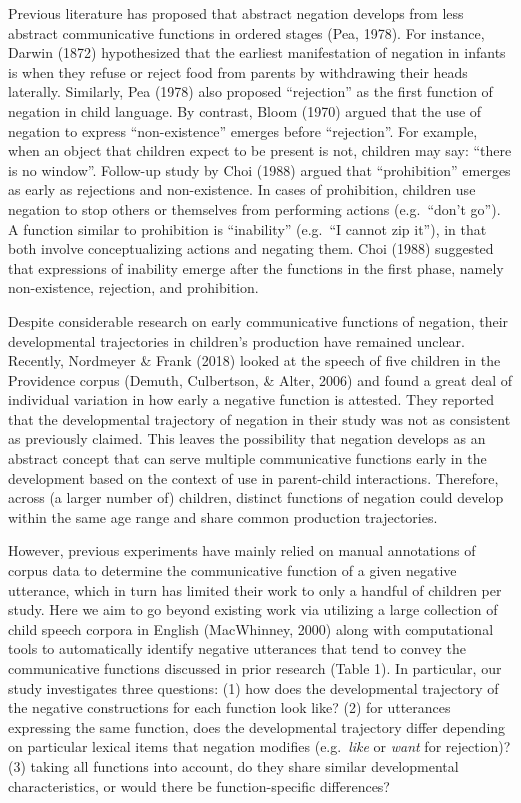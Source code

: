 \documentclass[10pt, letterpaper]{article}
\begin{document}
Previous literature has proposed that abstract negation develops from
less abstract communicative functions in ordered stages (Pea, 1978). For
instance, Darwin (1872) hypothesized that the earliest manifestation of
negation in infants is when they refuse or reject food from parents by
withdrawing their heads laterally. Similarly, Pea (1978) also proposed
``rejection'' as the first function of negation in child language. By
contrast, Bloom (1970) argued that the use of negation to express
``non-existence'' emerges before ``rejection''. For example, when an
object that children expect to be present is not, children may say:
``there is no window''. Follow-up study by Choi (1988) argued that
``prohibition'' emerges as early as rejections and non-existence. In
cases of prohibition, children use negation to stop others or themselves
from performing actions (e.g.~``don't go''). A function similar to
prohibition is ``inability'' (e.g.~``I cannot zip it''), in that both
involve conceptualizing actions and negating them. Choi (1988) suggested
that expressions of inability emerge after the functions in the first
phase, namely non-existence, rejection, and prohibition.

Despite considerable research on early communicative functions of
negation, their developmental trajectories in children's production have
remained unclear. Recently, Nordmeyer \& Frank (2018) looked at the
speech of five children in the Providence corpus (Demuth, Culbertson, \&
Alter, 2006) and found a great deal of individual variation in how early
a negative function is attested. They reported that the developmental
trajectory of negation in their study was not as consistent as
previously claimed. This leaves the possibility that negation develops
as an abstract concept that can serve multiple communicative functions
early in the development based on the context of use in parent-child
interactions. Therefore, across (a larger number of) children, distinct
functions of negation could develop within the same age range and share
common production trajectories.

However, previous experiments have mainly relied on manual annotations
of corpus data to determine the communicative function of a given
negative utterance, which in turn has limited their work to only a
handful of children per study. Here we aim to go beyond existing work
via utilizing a large collection of child speech corpora in English
(MacWhinney, 2000) along with computational tools to automatically
identify negative utterances that tend to convey the communicative
functions discussed in prior research (Table 1). In particular, our
study investigates three questions: (1) how does the developmental
trajectory of the negative constructions for each function look like?
(2) for utterances expressing the same function, does the developmental
trajectory differ depending on particular lexical items that negation
modifies (e.g.~\emph{like} or \emph{want} for rejection)? (3) taking all
functions into account, do they share similar developmental
characteristics, or would there be function-specific differences?
\end{document}
